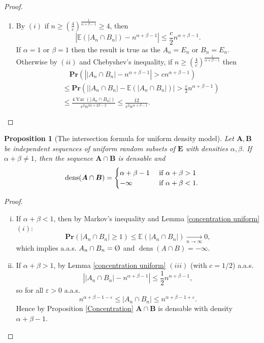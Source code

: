 \documentclass{article}
\DeclareMathOperator{\dens}{dens}
\DeclareMathOperator{\Var}{Var}
\newcommand{\vide}{\textup{\O}}
\newcommand{\bs}{\boldsymbol}
\newcommand{\tendvers}{\xrightarrow[n\to\infty]{}}
\def\Pr{\mathbf{Pr}}
\newtheorem{prop}[thm]{Proposition}
\theoremstyle{remark}
\begin{document}
\begin{proof}
\begin{enumerate}[$(i)$]
    \item By $(i)$ if $n\geq \left(\frac{4}{c}\right)^{\frac{1}{\alpha+\beta-1}}\geq 4$, then\[\left|\mathbb{E}(|A_n\cap B_n|)-n^{\alpha+\beta-1}\right|\leq \frac{c}{2}n^{\alpha+\beta-1}.\]
    If $\alpha = 1$ or $\beta = 1$ then the result is true as the $A_n = E_n$ or $B_n=E_n$. Otherwise by $(ii)$ and Chebyshev's inequality, if $n\geq \left(\frac{4}{c}\right)^{\frac{1}{\alpha+\beta-1}}$ then
    \[\begin{split} &\quad\Pr\left(\left||A_n\cap B_n|-n^{\alpha+\beta-1}\right|> cn^{\alpha+\beta-1}\right)\\
    & \leq \Pr\left(\left||A_n\cap B_n|-\mathbb{E}(|A_n\cap B_n|)\right|> \frac{c}{2}n^{\alpha+\beta-1}\right)\\
    & \leq \frac{4\Var(|A_n\cap B_n|)}{c^2n^{2\alpha+2\beta-2}} \leq  \frac{12}{c^2n^{\alpha+\beta-1}}.
    \end{split}\]
\end{enumerate}
\end{proof}

\begin{prop} [The intersection formula for uniform density model]\label{intersection uniform}
Let $\bs A,\bs B$ be independent sequences of uniform random subsets of $\bs E$ with densities $\alpha,\beta$. If $\alpha + \beta \neq 1$, then the sequence $\bs A\cap \bs B$ is densable and
        \[\dens(\bs A\cap \bs B) = \begin{cases}
            \alpha + \beta -1 &  \textup{ if } \alpha + \beta > 1\\
            -\infty & \textup{ if } \alpha + \beta < 1.
        \end{cases}\]
\end{prop}
\begin{proof}\quad
    \begin{enumerate}[(i)]
        \item If $\alpha + \beta <1$, then by Markov's inequality and Lemma \ref{concentration uniform} $(i)$:
        \[\Pr(|A_n\cap B_n|\geq 1)\leq \mathbb{E}(|A_n\cap B_n|)\tendvers 0,\]
        which implies a.a.s. $A_n\cap B_n = \vide$ and $\dens(A\cap B) = -\infty$.
        \item If $\alpha + \beta >1$, by Lemma \ref{concentration uniform} $(iii)$ (with $c = 1/2$) a.a.s.
        \[\left||A_n\cap B_n|-n^{\alpha+\beta-1}\right|\leq \frac{1}{2}n^{\alpha+\beta-1},\]
        so for all $\varepsilon>0$ a.a.s.
        \[n^{\alpha+\beta-1-\varepsilon} \leq |A_n\cap B_n|\leq n^{\alpha+\beta-1+\varepsilon}.\]
        Hence by Proposition \ref{Concentration} $\bs A \cap \bs B$ is densable with density $\alpha + \beta -1$.
    \end{enumerate}
\end{proof}
\end{document}

